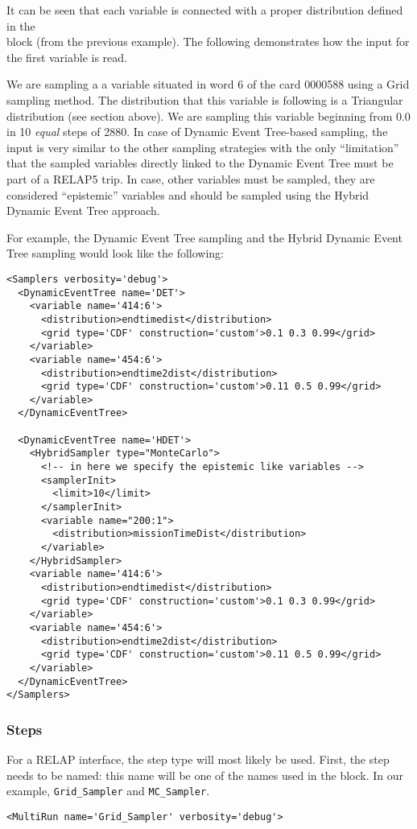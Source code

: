 It can be seen that each variable is connected with a proper distribution
defined in the \\ block (from the previous example).
%
The following demonstrates how the input for the first variable is read.

We are sampling a a variable situated in word 6 of the card 0000588 using a Grid
sampling method.
%
The distribution that this variable is following is a Triangular distribution
(see section above).
%
We are sampling this variable beginning from 0.0 in 10 \textit{equal} steps of
2880.
%
In case of Dynamic Event Tree-based sampling, the input is very similar to the other
sampling strategies with the only ``limitation'' that the sampled variables
directly linked to the Dynamic Event Tree must be part of a RELAP5 trip.
In case, other variables must be sampled, they are considered ``epistemic'' variables and
should be sampled using the Hybrid Dynamic Event Tree approach.


For example, the Dynamic Event Tree sampling and the  Hybrid Dynamic Event Tree sampling would look
like the following:

\begin{lstlisting}[style=XML,morekeywords={name,type,construction,lowerBound,steps,limit,initialSeed}]
<Samplers verbosity='debug'>
  <DynamicEventTree name='DET'>
    <variable name='414:6'>
      <distribution>endtimedist</distribution>
      <grid type='CDF' construction='custom'>0.1 0.3 0.99</grid>
    </variable>
    <variable name='454:6'>
      <distribution>endtime2dist</distribution>
      <grid type='CDF' construction='custom'>0.11 0.5 0.99</grid>
    </variable>
  </DynamicEventTree>

  <DynamicEventTree name='HDET'>
    <HybridSampler type="MonteCarlo">
      <!-- in here we specify the epistemic like variables -->
      <samplerInit>
        <limit>10</limit>
      </samplerInit>
      <variable name="200:1">
        <distribution>missionTimeDist</distribution>
      </variable>
    </HybridSampler>
    <variable name='414:6'>
      <distribution>endtimedist</distribution>
      <grid type='CDF' construction='custom'>0.1 0.3 0.99</grid>
    </variable>
    <variable name='454:6'>
      <distribution>endtime2dist</distribution>
      <grid type='CDF' construction='custom'>0.11 0.5 0.99</grid>
    </variable>
  </DynamicEventTree>
</Samplers>
\end{lstlisting}

\subsubsection{Steps}
For a RELAP interface, the  step type will most likely be
used.
%
First, the step needs to be named: this name will be one of the names used in
the  block.
%
In our example, \texttt{Grid\_Sampler} and \texttt{MC\_Sampler}.
%
\begin{lstlisting}[style=XML,morekeywords={name,debug,re-seeding}]
     <MultiRun name='Grid_Sampler' verbosity='debug'>
\end{lstlisting}

